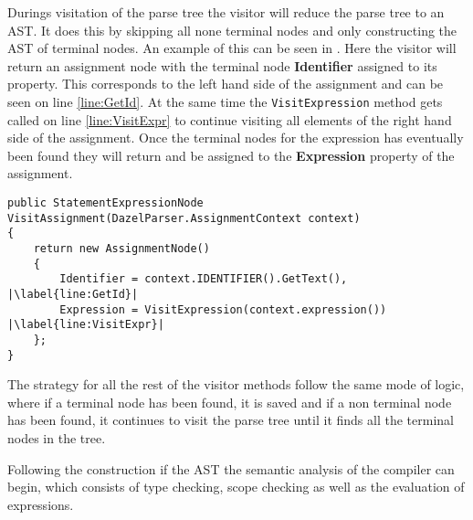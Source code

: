 Durings visitation of the parse tree the visitor will reduce the parse tree to an AST. It does this by skipping all none terminal nodes and only constructing the AST of terminal nodes. An example of this can be seen in . 
Here the visitor will return an assignment node with the terminal node \textbf{Identifier} assigned to its property. This corresponds to the left hand side of the assignment and can be seen on line \ref{line:GetId}. At the same time the \texttt{VisitExpression} method gets called on line \ref{line:VisitExpr} to continue visiting all elements of the right hand side of the assignment. Once the terminal nodes for the expression has eventually been found they will return and be assigned to the \textbf{Expression} property of the assignment.

\begin{lstlisting}[language=CSharp, caption={Visit assignment}, label={lst:VisitAssignment},escapechar=|]
public StatementExpressionNode VisitAssignment(DazelParser.AssignmentContext context)
{
    return new AssignmentNode()
    {
        Identifier = context.IDENTIFIER().GetText(), |\label{line:GetId}|
        Expression = VisitExpression(context.expression()) |\label{line:VisitExpr}|
    };
}
\end{lstlisting}

The strategy for all the rest of the visitor methods follow the same mode of logic, where if a terminal node has been found, it is saved and if a non terminal node has been found, it continues to visit the parse tree until it finds all the terminal nodes in the tree.

Following the construction if the AST the semantic analysis of the compiler can begin, which consists of type checking, scope checking as well as the evaluation of expressions.
